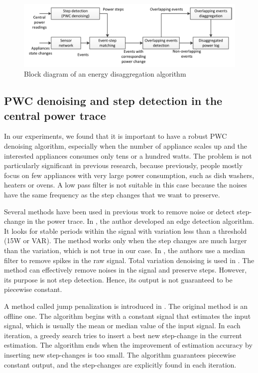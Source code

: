 \begin{figure}[htb]
  \centering
  \includegraphics[width=\textwidth]{figures/algooverview}
  \caption{Block diagram of an energy disaggregation algorithm}
  \label{fig:algooverview}
\end{figure}

\subsection{PWC denoising and step detection in the central power trace}

In our experiments, we found that it is important to have a robust PWC denoising algorithm, especially when the number of appliance scales up and the interested appliances consumes only tens or a hundred watts. The problem is not particularly significant in previous research, because previously, people mostly focus on few appliances with very large power consumption, such as dish washers, heaters or ovens. A low pass filter is not suitable in this case because the noises have the same frequency as the step changes that we want to preserve. 

Several methods have been used in previous work to remove noise or detect step-change in the power trace. In \cite{Hart1992}, the author developed an edge detection algorithm. It looks for stable periods within the signal with variation less than a threshold (15W or VAR). The method works only when the step changes are much larger than the variation, which is not true in our case. In \cite{Norford1996}, the authors use a median filter to remove spikes in the raw signal. Total variation denoising is used in \cite{Kolter2012}. The method can effectively remove noises in the signal and preserve steps. However, its purpose is not step detection. Hence, its output is not guaranteed to be piecewise constant. 

A method called jump penalization is introduced in \cite{Little2011}. The original method is an offline one. The algorithm begins with a constant signal that estimates the input signal, which is usually the mean or median value of the input signal. In each iteration, a greedy search tries to insert a best new step-change in the current estimation. The algorithm ends when the improvement of estimation accuracy by inserting new step-changes is too small. The algorithm guarantees piecewise constant output, and the step-changes are explicitly found in each iteration. 

